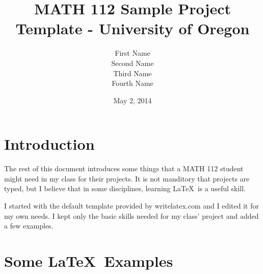 \documentclass{article}
\title{MATH 112 Sample Project Template - University of Oregon}
\author{First Name \\ Second Name \\ Third Name \\ Fourth Name}
\date{May 2, 2014} %
\begin{document}
\maketitle

\section{Introduction}

The rest of this document introduces some things that a MATH 112 student might need in my class for their projects.  It is not manditory that projects are typed, but I believe that in some disciplines, learning \LaTeX\ is a useful skill.

I started with the default template provided by writelatex.com and I edited it for my own needs.  I kept only the basic skills needed for my class' project and added a few examples.

\section{Some \LaTeX\ Examples}\label{sec:examples}
\end{document}

